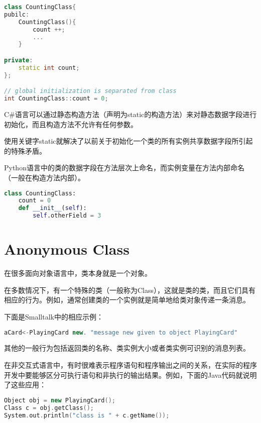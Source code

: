 \begin{lstlisting}[language=C++]
class CountingClass{
pubilc:
	CountingClass(){
		count ++;
		...
	}

private:
	static int count;
};

// global initialization is separated from class
int CountingClass::count = 0;
\end{lstlisting}

C\#语言可以通过静态构造方法（声明为static的构造方法）来对静态数据字段进行初始化，而且构造方法不允许有任何参数。


使用关键字static就解决了以前关于初始化一个类的所有实例共享数据字段所引起的特殊矛盾。

Python语言中的类的数据字段在方法层次上命名，而实例变量在方法内部命名（一般在构造方法内部）。

\begin{lstlisting}[language=Python]
class CountingClass:
	count = 0
	def __init__(self):
		self.otherField = 3
\end{lstlisting}



\section{Anonymous Class}

在很多面向对象语言中，类本身就是一个对象。

在多数情况下，有一个特殊的类（一般称为Class），这就是类的类，而且它们具有相应的行为。例如，通常创建类的一个实例就是简单地给类对象传递一条消息。




下面是Smalltalk中的相应示例：

\begin{lstlisting}[language=C++]
aCard<-PlayingCard new. "message new given to object PlayingCard"
\end{lstlisting}

其他的一般行为包括返回类的名称、类实例大小或者类实例可识别的消息列表。

在非交互式语言中，有时很难表示程序语句和程序输出之间的关系，在实际的程序开发中要能够区分可执行语句和非执行的输出结果。例如，下面的Java代码就说明了这些应用：




\begin{lstlisting}[language=C++]
Object obj = new PlayingCard();
Class c = obj.getClass();
System.out.println("class is " + c.getName());
\end{lstlisting}

